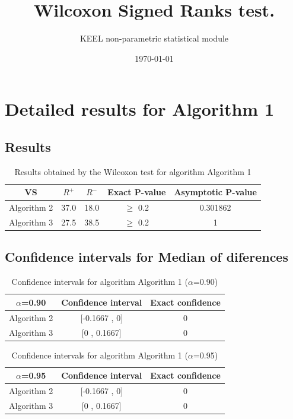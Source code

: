 \documentclass[a4paper,10pt]{article}
\title{Wilcoxon Signed Ranks test.}
\date{\today}
\author{KEEL non-parametric statistical module}
\begin{document}
\pagestyle{empty}
\maketitle
\thispagestyle{empty}



\section{Detailed results for Algorithm 1}


\subsection{Results}

\begin{table}[!htp]
\centering\small
\begin{tabular}{
|c|c|c|c|c|}
\hline
 VS & $R^{+}$ & $R^{-}$ & Exact P-value & Asymptotic P-value \\ \hline 
Algorithm 2 & 37.0 & 18.0 & $\geq$ 0.2 & 0.301862\\ \hline 
Algorithm 3 & 27.5 & 38.5 & $\geq$ 0.2 & 1\\ \hline 

\end{tabular}
\caption{Results obtained by the Wilcoxon test for algorithm Algorithm 1}
\end{table}

\subsection{Confidence intervals for Median of diferences}

\begin{table}[!htp]
\centering\small
\begin{tabular}{
|c|c|c|}
\hline
 $\alpha$=0.90 & Confidence interval & Exact confidence \\ \hline 
Algorithm 2 & [-0.1667 , 0] & 0\\ \hline 
Algorithm 3 & [0 , 0.1667] & 0\\ \hline 

\end{tabular}
\caption{Confidence intervals for algorithm Algorithm 1 ($\alpha$=0.90)}
\end{table}
\begin{table}[!htp]
\centering\small
\begin{tabular}{
|c|c|c|}
\hline
 $\alpha$=0.95 & Confidence interval & Exact confidence \\ \hline 
Algorithm 2 & [-0.1667 , 0] & 0\\ \hline 
Algorithm 3 & [0 , 0.1667] & 0\\ \hline 

\end{tabular}
\caption{Confidence intervals for algorithm Algorithm 1 ($\alpha$=0.95)}
\end{table}
\end{document}
